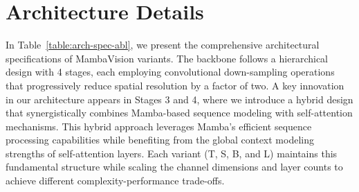 \begin{table}[h]
\centering
{}
\caption{Ablation study on window size for MambaVision model's performance. Experiments on COCO dataset~\cite{lin2014microsoft} are performed using Mask-RCNN~\cite{he2017mask} head and ×1 LR schedule. Throughput is measured for image classification on a single NVIDIA A100 GPU with batch size 128.}
\label{tab:abl_study_window}
\end{table}



\section{Architecture Details}
\label{sec:arch}
In Table~\ref{table:arch-spec-abl}, we present the comprehensive architectural specifications of MambaVision variants. The backbone follows a hierarchical design with 4 stages, each employing convolutional down-sampling operations that progressively reduce spatial resolution by a factor of two. A key innovation in our architecture appears in Stages 3 and 4, where we introduce a hybrid design that synergistically combines Mamba-based sequence modeling with self-attention mechanisms. This hybrid approach leverages Mamba's efficient sequence processing capabilities while benefiting from the global context modeling strengths of self-attention layers. Each variant (T, S, B, and L) maintains this fundamental structure while scaling the channel dimensions and layer counts to achieve different complexity-performance trade-offs.


